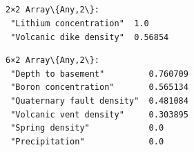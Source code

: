 \documentclass[11pt]{article}
\begin{document}
    \begin{center}
    \end{center}
    { \hspace*{\fill} \\}

    \begin{Verbatim}[commandchars=\\\{\}]

    \end{Verbatim}

    \begin{center}
    \end{center}
    { \hspace*{\fill} \\}

    \begin{center}
    \end{center}
    { \hspace*{\fill} \\}

    \begin{Verbatim}[commandchars=\\\{\}]

    \end{Verbatim}

    \begin{center}
    \end{center}
    { \hspace*{\fill} \\}


    \begin{Verbatim}[commandchars=\\\{\}]
2×2 Array\{Any,2\}:
 "Lithium concentration"  1.0
 "Volcanic dike density"  0.56854
    \end{Verbatim}



    \begin{Verbatim}[commandchars=\\\{\}]
6×2 Array\{Any,2\}:
 "Depth to basement"         0.760709
 "Boron concentration"       0.565134
 "Quaternary fault density"  0.481084
 "Volcanic vent density"     0.303895
 "Spring density"            0.0
 "Precipitation"             0.0
    \end{Verbatim}
\end{document}
